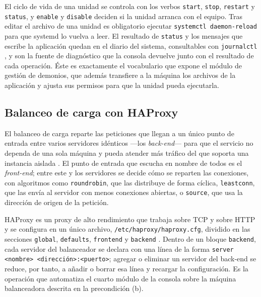 El ciclo de vida de una unidad se controla con los verbos
\texttt{start}, \texttt{stop}, \texttt{restart} y \texttt{status}, y
\texttt{enable} y \texttt{disable} deciden si la unidad arranca con el
equipo. Tras editar el archivo de una unidad es obligatorio ejecutar
\texttt{systemctl daemon-reload} para que systemd lo vuelva a leer. El
resultado de \texttt{status} y los mensajes que escribe la aplicación
quedan en el diario del sistema, consultables con \texttt{journalctl}
\parencite{systemd}, y son la fuente de diagnóstico que la consola
devuelve junto con el resultado de cada operación. Éste es exactamente
el vocabulario que expone el módulo de gestión de demonios, que además
transfiere a la máquina los archivos de la aplicación y ajusta sus
permisos para que la unidad pueda ejecutarla.

\subsection{Balanceo de carga con HAProxy}
\label{sec:mt-haproxy}

El balanceo de carga reparte las peticiones que llegan a un único punto
de entrada entre varios servidores idénticos —los \emph{back-end}— para
que el servicio no dependa de una sola máquina y pueda atender más
tráfico del que soporta una instancia aislada \parencite{haproxy}. El
punto de entrada que escucha en nombre de todos es el \emph{front-end};
entre este y los servidores se decide cómo se reparten las conexiones,
con algoritmos como \texttt{roundrobin}, que las distribuye de forma
cíclica, \texttt{leastconn}, que las envía al servidor con menos
conexiones abiertas, o \texttt{source}, que usa la dirección de origen
de la petición.

HAProxy es un proxy de alto rendimiento que trabaja sobre TCP y sobre
HTTP y se configura en un único archivo,
\texttt{/etc/haproxy/haproxy.cfg}, dividido en las secciones
\texttt{global}, \texttt{defaults}, \texttt{frontend} y \texttt{backend}
\parencite{haproxy}. Dentro de un bloque \texttt{backend}, cada
servidor del balanceador se declara con una línea de la forma
\texttt{server <nombre> <dirección>:<puerto>}; agregar o eliminar un
servidor del back-end se reduce, por tanto, a añadir o borrar esa línea
y recargar la configuración. Es la operación que automatiza el cuarto
módulo de la consola sobre la máquina balanceadora descrita en la
precondición (b).
